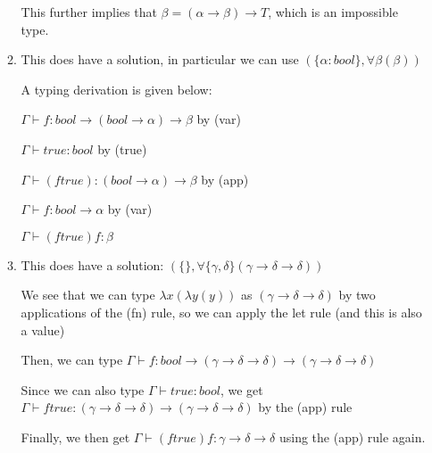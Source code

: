 \begin{enumerate}[label=(\alph*)]
\begin{enumerate}[label=(\roman*)]
        This further implies that $\beta = (\alpha \rightarrow \beta) \rightarrow T$, which is an impossible type.

      \item
        This does have a solution, in particular we can use $(\{\alpha : bool\}, \forall \beta(\beta))$

        A typing derivation is given below:

        $\Gamma \vdash f : bool \rightarrow (bool \rightarrow \alpha) \rightarrow \beta$ by (var)

        $\Gamma \vdash true : bool$ by (true)

        $\Gamma \vdash (f true) : (bool \rightarrow \alpha) \rightarrow \beta$ by (app)

        $\Gamma \vdash f : bool \rightarrow \alpha$ by (var)

        $\Gamma \vdash (f true) f : \beta$

      \item
        This does have a solution: $(\{\}, \forall \{\gamma, \delta\} (\gamma \rightarrow \delta \rightarrow \delta))$

        We see that we can type $\lambda x(\lambda y(y))$ as $(\gamma \rightarrow \delta \rightarrow \delta)$ by two applications of the (fn) rule, so we can apply the let rule (and this is also a value)

        Then, we can type $\Gamma \vdash f : bool \rightarrow (\gamma \rightarrow \delta \rightarrow \delta) \rightarrow (\gamma \rightarrow \delta \rightarrow \delta)$

        Since we can also type $\Gamma \vdash true : bool$, we get $\Gamma \vdash f true : (\gamma \rightarrow \delta \rightarrow \delta) \rightarrow (\gamma \rightarrow \delta \rightarrow \delta)$ by the (app) rule

        Finally, we then get $\Gamma \vdash (f true) f : \gamma \rightarrow \delta \rightarrow \delta$ using the (app) rule again.
        
    \end{enumerate}
        
\end{enumerate}

